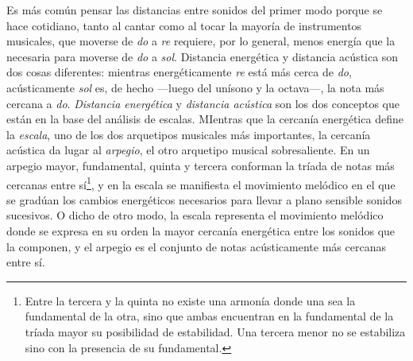 \documentclass[a4paper,11pt]{article}
\begin{document}
\begin{multicols}{2}
  Es más común pensar las distancias entre sonidos del primer modo porque se hace cotidiano, tanto al cantar como al tocar la mayoría de instrumentos musicales, que moverse de \emph{do} a \emph{re} requiere, por lo general, menos energía que la necesaria para moverse de \emph{do} a \emph{sol}. Distancia energética y distancia acústica son dos cosas diferentes: mientras energéticamente \emph{re} está más cerca de \emph{do}, acústicamente \emph{sol} es, de hecho ---luego del unísono y la \hbox{octava---,} la nota más cercana a \emph{do}. \emph{Distancia energética} y \emph{distancia acústica} son los dos conceptos que están en la base del análisis de escalas. MIentras que la cercanía energética define la \emph{escala}, uno de los dos arquetipos musicales más importantes, la cercanía acústica da lugar al \emph{arpegio}, el otro arquetipo musical sobresaliente. En un arpegio mayor, fundamental, quinta y tercera conforman la tríada de notas más cercanas entre sí\footnote{Entre la tercera y la quinta no existe una armonía donde una sea la fundamental de la otra, sino que ambas encuentran en la fundamental de la tríada mayor su posibilidad de estabilidad. Una tercera menor no se estabiliza sino con la presencia de su fundamental.}, y en la escala se manifiesta el movimiento melódico en el que se gradúan los cambios energéticos necesarios para llevar a plano sensible sonidos sucesivos. O dicho de otro modo, la escala representa el movimiento melódico donde se expresa en su orden la mayor cercanía energética entre los sonidos que la componen, y el arpegio es el conjunto de notas acústicamente más cercanas entre sí.
\end{multicols}
\end{document}
